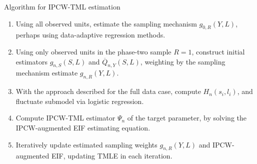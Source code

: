 \documentclass{beamer}
\begin{document}
\begin{frame}[c]{Algorithm for IPCW-TML estimation}

\begin{center}
\begin{enumerate}\label{ipcwtmle_algo}
  \itemsep8pt
  \item Using all observed units, estimate the sampling mechanism
    $g_{0,R}(Y, L)$, perhaps using data-adaptive regression methods.
  \item Using only observed units in the phase-two sample $R = 1$,
    construct initial estimators $g_{n,S}(S,L)$ and $\overline{Q}_{n,Y}(S,L)$,
    weighting by the sampling mechanism estimate $g_{n,R}(Y,L)$.
  \item With the approach described for the full data case, compute
    $H_n(s_i,l_i)$, and fluctuate submodel via logistic regression.
  \item Compute IPCW-TML estimator $\Psi_n$ of the target parameter, by solving
    the IPCW-augmented EIF estimating equation.
  \item Iteratively update estimated sampling weights $g_{n,R}(Y,L)$ and
    IPCW-augmented EIF, updating TMLE in each iteration.
\end{enumerate}
\end{center}


\end{frame}

\end{document}

